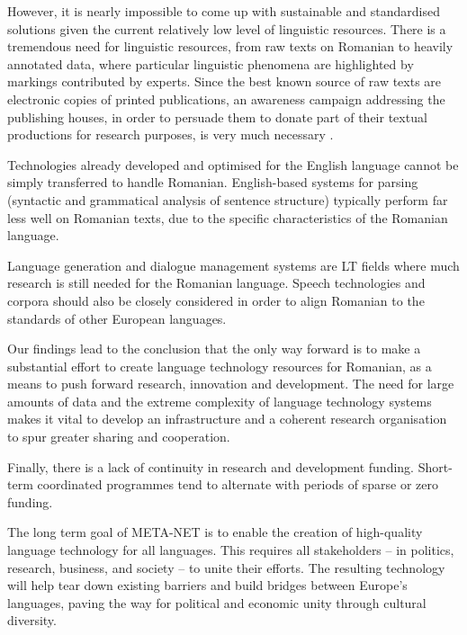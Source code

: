 \begin{multicols}{2}
However, it is nearly impossible to come up with sustainable and standardised solutions given the current relatively low level of linguistic resources. There is a tremendous need for linguistic resources, from raw texts on Romanian to heavily annotated data, where particular linguistic phenomena are highlighted by markings contributed by experts. Since the best known source of raw texts are electronic copies of printed publications, an awareness campaign addressing the publishing houses, in order to persuade them to donate part of their textual productions for research purposes, is very much necessary \cite{cristea4}.

Technologies already developed and optimised for the English language cannot be simply transferred to handle Romanian. English-based systems for parsing (syntactic and grammatical analysis of sentence structure) typically perform far less well on Romanian texts, due to the specific characteristics of the Romanian language.

Language generation and dialogue management systems are LT fields where much research is still needed for the Romanian language. Speech technologies and corpora should also be closely considered in order to align Romanian to the standards of other European languages.

Our findings lead to the conclusion that the only way forward is to make a substantial effort to create language technology resources for Romanian, as a means to push forward research, innovation and development. The need for large amounts of data and the extreme complexity of language technology systems makes it vital to develop an infrastructure and a coherent research organisation to spur greater sharing and cooperation.

Finally, there is a lack of continuity in research and development funding. Short-term coordinated programmes tend to alternate with periods of sparse or zero funding. %

The long term goal of META-NET is to enable the creation of high-quality language technology for all languages. This requires all stakeholders – in politics, research, business, and society – to unite their efforts. The resulting technology will help tear down existing barriers and build bridges between Europe’s languages, paving the way for political and economic unity through cultural diversity. 

\end{multicols}

